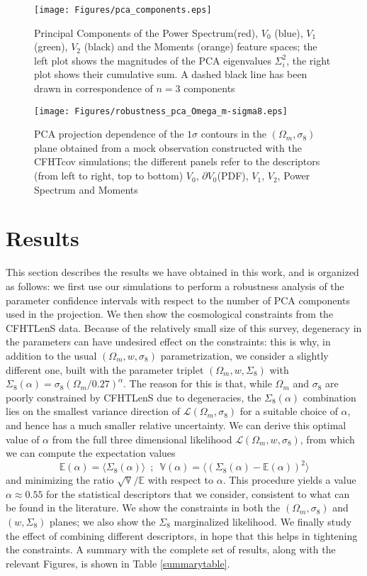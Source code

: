 \documentclass[reprint,aps,prd,superscriptaddress,showkeys,showpacs]{revtex4-1}
\begin{document}
%
\begin{figure*}
\texttt{[image: Figures/pca\_components.eps]}
\caption{Principal Components of the Power Spectrum(red), $V_0$ (blue), $V_1$ (green), $V_2$ (black) and the Moments (orange) feature spaces; the left plot shows the magnitudes of the PCA eigenvalues $\Sigma_i^2$, the right plot shows their cumulative sum. A dashed black line has been drawn in correspondence of $n=3$ components}
\label{pcafig}
\end{figure*}
%
\begin{figure*}
\texttt{[image: Figures/robustness\_pca\_Omega\_m-sigma8.eps]}
\caption{PCA projection dependence of the $1\sigma$ contours in the $(\Omega_m,\sigma_8)$ plane obtained from a mock observation constructed with the CFHTcov simulations; the different panels refer to the descriptors (from left to right, top to bottom) $V_0$, $\partial V_0$(PDF), $V_1$, $V_2$, Power Spectrum and Moments}
\label{robustnessfig}
\end{figure*}
%

\section{Results}
\label{results}
This section describes the results we have obtained in this work, and is organized as follows: we first use our simulations to perform a robustness analysis of the parameter confidence intervals with respect to the number of PCA components used in the projection. We then show the cosmological constraints from the CFHTLenS data. Because of the relatively small size of this survey, degeneracy in the parameters can have undesired effect on the constraints: this is why, in addition to the usual $(\Omega_m,w,\sigma_8)$ parametrization, we consider a slightly different one, built with the parameter triplet $(\Omega_m,w,\Sigma_8)$ with $\Sigma_8(\alpha)=\sigma_8(\Omega_m/0.27)^\alpha$. The reason for this is that, while $\Omega_m$ and $\sigma_8$ are poorly constrained by CFHTLenS due to degeneracies, the $\Sigma_8(\alpha)$ combination lies on the smallest variance direction of $\mathcal{L}(\Omega_m,\sigma_8)$ for a suitable choice of $\alpha$, and hence has a much smaller relative uncertainty. We can derive this optimal value of $\alpha$ from the full three dimensional likelihood $\mathcal{L}(\Omega_m,w,\sigma_8)$, from which we can compute the expectation values
\begin{equation}
\mathds{E}(\alpha) = \langle\Sigma_8(\alpha)\rangle \,\,\, ; \,\,\, \mathds{V}(\alpha) = \langle(\Sigma_8(\alpha)-\mathds{E}(\alpha))^2\rangle
\end{equation}
%
and minimizing the ratio $\sqrt{\mathds{V}}/\mathds{E}$ with respect to $\alpha$. This procedure yields a value $\alpha\approx0.55$ for the statistical descriptors that we consider, consistent to what can be found in the literature. We show the constraints in both the $(\Omega_m,\sigma_8)$ and $(w,\Sigma_8)$ planes; we also show the $\Sigma_8$ marginalized likelihood. We finally study the effect of combining different descriptors, in hope that this helps in tightening the constraints. A summary with the complete set of results, along with the relevant Figures, is shown in Table \ref{summarytable}. 
\end{document}
